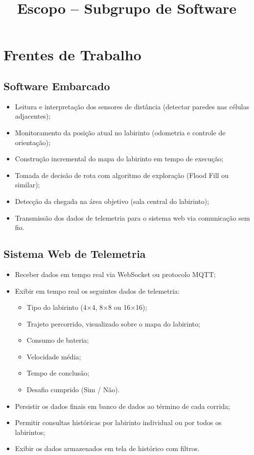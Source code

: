 \documentclass[a4paper,12pt]{article}
\title{Escopo – Subgrupo de Software}
\date{}
\begin{document}
\maketitle

\section{Frentes de Trabalho}

\subsection{Software Embarcado}

\begin{itemize}
    \item Leitura e interpretação dos sensores de distância (detectar paredes nas células adjacentes);
    \item Monitoramento da posição atual no labirinto (odometria e controle de orientação);
    \item Construção incremental do mapa do labirinto em tempo de execução;
    \item Tomada de decisão de rota com algoritmo de exploração (Flood Fill ou similar);
    \item Detecção da chegada na área objetivo (sala central do labirinto);
    \item Transmissão dos dados de telemetria para o sistema web via comunicação sem fio.
\end{itemize}

\subsection{Sistema Web de Telemetria}

\begin{itemize}
    \item Receber dados em tempo real via WebSocket ou protocolo MQTT;
    \item Exibir em tempo real os seguintes dados de telemetria:
    \begin{itemize}
        \item Tipo do labirinto (4×4, 8×8 ou 16×16);
        \item Trajeto percorrido, visualizado sobre o mapa do labirinto;
        \item Consumo de bateria;
        \item Velocidade média;
        \item Tempo de conclusão;
        \item Desafio cumprido (Sim / Não).
    \end{itemize}
    \item Persistir os dados finais em banco de dados ao término de cada corrida;
    \item Permitir consultas históricas por labirinto individual ou por todos os labirintos;
    \item Exibir os dados armazenados em tela de histórico com filtros.
\end{itemize}
\end{document}
